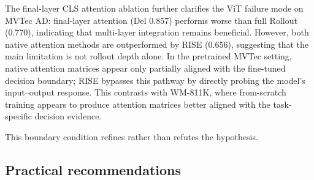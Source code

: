 \documentclass[11pt,a4paper]{article}
\begin{document}
The final-layer CLS attention ablation further clarifies the ViT failure mode on MVTec AD: final-layer attention (Del 0.857) performs worse than full Rollout (0.770), indicating that multi-layer integration remains beneficial. However, both native attention methods are outperformed by RISE (0.656), suggesting that the main limitation is not rollout depth alone. In the pretrained MVTec setting, native attention matrices appear only partially aligned with the fine-tuned decision boundary; RISE bypasses this pathway by directly probing the model's input--output response. This contrasts with WM-811K, where from-scratch training appears to produce attention matrices better aligned with the task-specific decision evidence.

This boundary condition refines rather than refutes the hypothesis.

\subsection{Practical recommendations}
\end{document}
